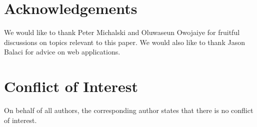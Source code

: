\documentclass[11pt]{article}
\begin{document}
\section*{Acknowledgements}

We would like to thank Peter Michalski and Oluwaseun Owojaiye for fruitful
discussions on topics relevant to this paper.  We would also like to thank Jason
Balaci for advice on web applications.

\section*{Conflict of Interest}

On behalf of all authors, the corresponding author states that there is no
conflict of interest.



\end{document}
